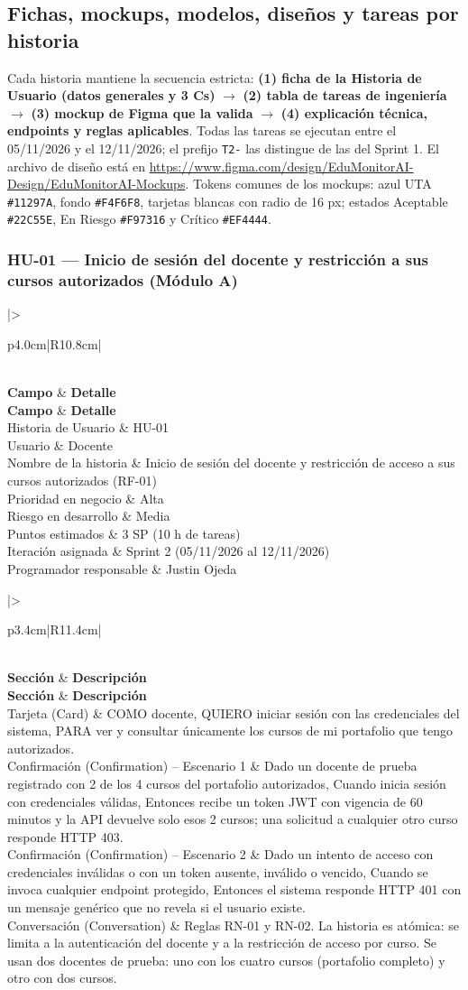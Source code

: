 \documentclass[11pt,a4paper]{article}
\newcommand{\hd}[1]{\textbf{#1}}
\newcommand{\fichahu}[7]{%
\begin{longtable}{|>{\bfseries\raggedright\arraybackslash}p{4.0cm}|R{10.8cm}|}
\caption{Ficha de #1: datos generales}\\
\hline \hd{Campo} & \hd{Detalle}\\ \hline \endfirsthead
\hline \hd{Campo} & \hd{Detalle}\\ \hline \endhead
Historia de Usuario & #1\\ \hline
Usuario & #2\\ \hline
Nombre de la historia & #3\\ \hline
Prioridad en negocio & #4\\ \hline
Riesgo en desarrollo & #5\\ \hline
Puntos estimados & #6\\ \hline
Iteración asignada & Sprint 2 (05/11/2026 al 12/11/2026)\\ \hline
Programador responsable & #7\\ \hline
\end{longtable}}
\newcommand{\tresc}[5]{%
\begin{longtable}{|>{\bfseries\raggedright\arraybackslash}p{3.4cm}|R{11.4cm}|}
\caption{Ficha de #1: criterios de las 3 Cs}\\
\hline \hd{Sección} & \hd{Descripción}\\ \hline \endfirsthead
\hline \hd{Sección} & \hd{Descripción}\\ \hline \endhead
Tarjeta (Card) & #2\\ \hline
Confirmación (Confirmation) -- Escenario 1 & #3\\ \hline
Confirmación (Confirmation) -- Escenario 2 & #4\\ \hline
Conversación (Conversation) & #5\\ \hline
\end{longtable}}
\begin{document}
\subsection{Fichas, mockups, modelos, diseños y tareas por historia}
Cada historia mantiene la secuencia estricta: \textbf{(1) ficha de la Historia de Usuario (datos generales y 3 Cs)} $\rightarrow$ \textbf{(2) tabla de tareas de ingeniería} $\rightarrow$ \textbf{(3) mockup de Figma que la valida} $\rightarrow$ \textbf{(4) explicación técnica, endpoints y reglas aplicables}. Todas las tareas se ejecutan entre el 05/11/2026 y el 12/11/2026; el prefijo \texttt{T2-} las distingue de las del Sprint 1. El archivo de diseño está en \url{https://www.figma.com/design/EduMonitorAI-Design/EduMonitorAI-Mockups}. Tokens comunes de los mockups: azul UTA \texttt{\#11297A}, fondo \texttt{\#F4F6F8}, tarjetas blancas con radio de 16 px; estados Aceptable \texttt{\#22C55E}, En Riesgo \texttt{\#F97316} y Crítico \texttt{\#EF4444}.

\subsubsection{HU-01 --- Inicio de sesión del docente y restricción a sus cursos autorizados (Módulo A)}
\fichahu{HU-01}{Docente}
{Inicio de sesión del docente y restricción de acceso a sus cursos autorizados (RF-01)}
{Alta}{Media}{3 SP (10 h de tareas)}{Justin Ojeda}

\tresc{HU-01}
{COMO docente, QUIERO iniciar sesión con las credenciales del sistema, PARA ver y consultar únicamente los cursos de mi portafolio que tengo autorizados.}
{Dado un docente de prueba registrado con 2 de los 4 cursos del portafolio autorizados, Cuando inicia sesión con credenciales válidas, Entonces recibe un token JWT con vigencia de 60 minutos y la API devuelve solo esos 2 cursos; una solicitud a cualquier otro curso responde HTTP 403.}
{Dado un intento de acceso con credenciales inválidas o con un token ausente, inválido o vencido, Cuando se invoca cualquier endpoint protegido, Entonces el sistema responde HTTP 401 con un mensaje genérico que no revela si el usuario existe.}
{Reglas RN-01 y RN-02. La historia es atómica: se limita a la autenticación del docente y a la restricción de acceso por curso. Se usan dos docentes de prueba: uno con los cuatro cursos (portafolio completo) y otro con dos cursos.}
\end{document}
